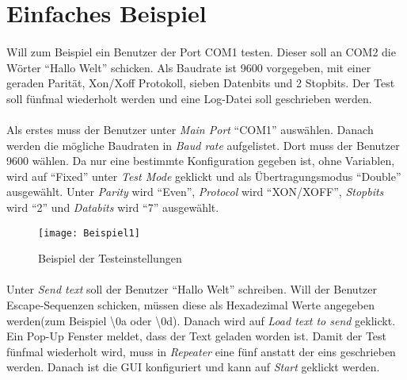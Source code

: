 \section{Einfaches Beispiel}
\paragraph{}
Will zum Beispiel ein Benutzer der Port COM1 testen. Dieser soll an COM2 die Wörter "`Hallo Welt"' schicken. Als Baudrate ist 9600 vorgegeben, mit einer geraden Parität, Xon/Xoff Protokoll, sieben Datenbits und 2 Stopbits. Der Test soll fünfmal wiederholt werden und eine Log-Datei soll geschrieben werden.

\paragraph{}
Als erstes muss der Benutzer unter \textit{Main Port} "`COM1"' auswählen. Danach werden die mögliche Baudraten in \textit{Baud rate} aufgelistet. Dort muss der Benutzer 9600 wählen. Da nur eine bestimmte Konfiguration gegeben ist, ohne Variablen, wird auf "`Fixed"' unter \textit{Test Mode} geklickt und als Übertragungsmodus "`Double"' ausgewählt. Unter \textit{Parity} wird "`Even"', \textit{Protocol} wird "`XON/XOFF"', \textit{Stopbits} wird "`2"' und \textit{Databits} wird "`7"' ausgewählt.\\

\begin{figure}[h]
  \begin{center}		%
    \texttt{[image: Beispiel1]}
  		  \caption{Beispiel der Testeinstellungen}
     \label{Beispielbild 1}
  \end{center}
\end{figure}

\paragraph{}
Unter \textit{Send text} soll der Benutzer "`Hallo Welt"' schreiben. Will der Benutzer Escape-Sequenzen schicken, müssen diese als Hexadezimal Werte angegeben werden(zum Beispiel \textbackslash0a oder \textbackslash0d). Danach wird auf \textit{Load text to send} geklickt. Ein Pop-Up Fenster meldet, dass der Text geladen worden ist. Damit der Test fünfmal wiederholt wird, muss in \textit{Repeater} eine fünf anstatt der eins geschrieben werden. Danach ist die GUI konfiguriert und kann auf \textit{Start} geklickt werden.\\

